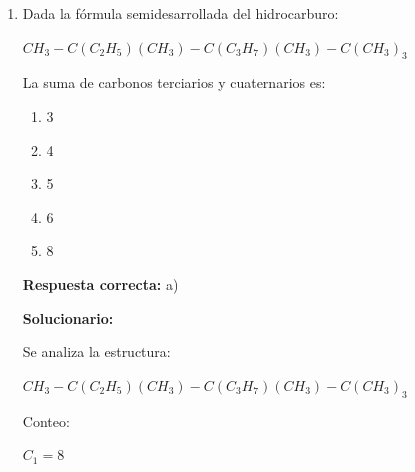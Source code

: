 \begin{enumerate}[resume]
	\begin{enumerate}[label=\alph*)]
		\item $1.1\ g/L$
		\item $0.8\ g/L$
		\item $1.0\ g/L$
		\item $0.6\ g/L$
		\item $2.0\ g/L$
	\end{enumerate}
	\textbf{Respuesta correcta:} b)
	
	\vspace{2mm}
	\textbf{Solucionario:}
	
	$\rho_{aire}=?$
	
	$T=2^\circ C=275^\circ K$
	
	$PM_{aire}=28.97\ g/mol$
	
	$P=50\ cm\ de\ Hg=500\ mm\ de\ Hg$
	
	$PV=nRT$
	
	$n=\dfrac{w}{PM}$
	
	$PV=\dfrac{w}{PM}RT$
	
	$P\,PM=\rho RT$
	
	$\rho=\dfrac{P\,PM}{RT}$
	
	$\rho=\dfrac{(500\ mmHg)(28.97\ g/mol)}{(62.4\ mmHg\cdot L/mol\cdot K)(275^\circ K)}=$
	
	\vspace{6mm}
	
	\item Dada la fórmula semidesarrollada del hidrocarburo:
	
	$CH_3-C(C_2H_5)(CH_3)-C(C_3H_7)(CH_3)-C(CH_3)_3$
	
	La suma de carbonos terciarios y cuaternarios es:
	
	\begin{enumerate}[label=\alph*)]
		\item 3
		\item 4
		\item 5
		\item 6
		\item 8
	\end{enumerate}
	\textbf{Respuesta correcta:} a)
	
	\vspace{2mm}
	\textbf{Solucionario:}
	
	Se analiza la estructura:
	
		$CH_3-C(C_2H_5)(CH_3)-C(C_3H_7)(CH_3)-C(CH_3)_3$
	
	Conteo:
	
	$C_1=8$
	

\end{enumerate}
